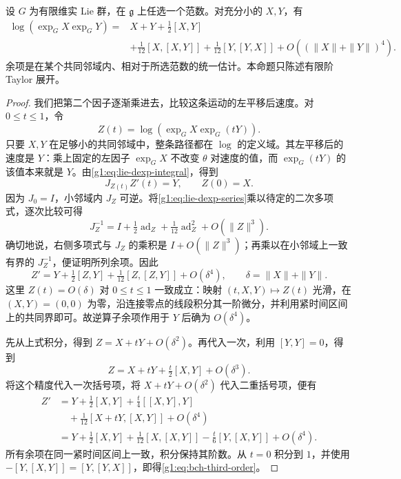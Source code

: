\begin{proposition}\label{g1:prop:bch-finite-order}
	设 \(G\) 为有限维实 Lie 群，在 \(\mathfrak g\) 上任选一个范数。对充分小的 \(X,Y\)，有
	\begin{equation}\label{g1:eq:bch-third-order}
		\begin{aligned}
			\log(\exp_GX\exp_GY)
			={}&X+Y+\tfrac12[X,Y]\\
			&+\tfrac1{12}[X,[X,Y]]+\tfrac1{12}[Y,[Y,X]]
			+O((\|X\|+\|Y\|)^4).
		\end{aligned}
	\end{equation}
	余项是在某个共同邻域内、相对于所选范数的统一估计。本命题只陈述有限阶 Taylor 展开。
\end{proposition}
\begin{proof}
	我们把第二个因子逐渐乘进去，比较这条运动的左平移后速度。对 \(0\le t\le1\)，令
	\[
		Z(t)=\log(\exp_GX\exp_G(tY)).
	\]
	只要 \(X,Y\) 在足够小的共同邻域中，整条路径都在 \(\log\) 的定义域。其左平移后的速度是 \(Y\)：乘上固定的左因子 \(\exp_GX\) 不改变 \(\theta\) 对速度的值，而 \(\exp_G(tY)\) 的该值本来就是 \(Y\)。由\eqref{g1:eq:lie-dexp-integral}，得到
	\[
		J_{Z(t)}Z'(t)=Y,\qquad Z(0)=X.
	\]
	因为 \(J_0=I\)，小邻域内 \(J_Z\) 可逆。将\eqref{g1:eq:lie-dexp-series}乘以待定的二次多项式，逐次比较可得
	\[
		J_Z^{-1}=I+\tfrac12\operatorname{ad}_Z+\tfrac1{12}\operatorname{ad}_Z^2+O(\|Z\|^3).
	\]
	确切地说，右侧多项式与 \(J_Z\) 的乘积是 \(I+O(\|Z\|^3)\)；再乘以在小邻域上一致有界的 \(J_Z^{-1}\)，便证明所列余项。因此
	\begin{equation}\label{g1:eq:bch-evolution}
		Z'=Y+\tfrac12[Z,Y]+\tfrac1{12}[Z,[Z,Y]]+O(\delta^4),
		\qquad \delta=\|X\|+\|Y\|.
	\end{equation}
	这里 \(Z(t)=O(\delta)\) 对 \(0\le t\le1\) 一致成立：映射 \((t,X,Y)\mapsto Z(t)\) 光滑，在 \((X,Y)=(0,0)\) 为零，沿连接零点的线段积分其一阶微分，并利用紧时间区间上的共同界即可。故逆算子余项作用于 \(Y\) 后确为 \(O(\delta^4)\)。

	先从上式积分，得到 \(Z=X+tY+O(\delta^2)\)。再代入一次，利用 \([Y,Y]=0\)，得到
	\[
		Z=X+tY+\tfrac t2[X,Y]+O(\delta^3).
	\]
	将这个精度代入一次括号项，将 \(X+tY+O(\delta^2)\) 代入二重括号项，便有
	\begin{align*}
		Z'
		&=Y+\tfrac12[X,Y]+\tfrac t4[[X,Y],Y]\\
		&\quad+\tfrac1{12}[X+tY,[X,Y]]+O(\delta^4)\\
		&=Y+\tfrac12[X,Y]+\tfrac1{12}[X,[X,Y]]
		-\tfrac t6[Y,[X,Y]]+O(\delta^4).
	\end{align*}
	所有余项在同一紧时间区间上一致，积分保持其阶数。从 \(t=0\) 积分到 \(1\)，并使用 \(-[Y,[X,Y]]=[Y,[Y,X]]\)，即得\eqref{g1:eq:bch-third-order}。
\end{proof}

